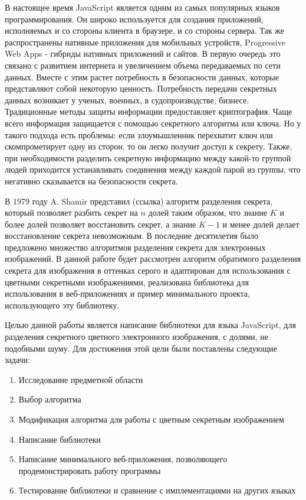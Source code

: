 \documentclass[a4paper,article,14pt]{extarticle}
\begin{document}


\tableofcontents
\pagebreak

В настоящее время JavaScript является одним из самых популярных языков программирования. Он широко используется для создания приложений,
исполняемых и со стороны клиента в браузере, и со стороны сервера. Так же распространены нативные приложения для мобильных устройств, 
Progressive Web Apps - гибриды нативных приложений и сайтов. В первую очередь это связано с развитием интернета и увеличением объема
передаваемых по сети данных. Вместе с этим растет потребность в безопасности данных, которые представляют собой некоторую ценность.
Потребность передачи секретных данных возникает у ученых, военных, в судопроизводстве, бизнесе. 
Традиционные методы защиты информации предоставляет криптография. Чаще всего информация защищается с помощью секретного алгоритма или ключа.
Но у такого подхода есть проблемы: если злоумышленник перехватит ключ или скомпрометирует одну из сторон, то он легко получит доступ к секрету.
Также, при необходимости разделить секретную информацию между какой-то группой людей приходится устанавливать соединения между каждой парой из группы,
что негативно сказывается на безопасности секрета.

В 1979 году A. Shamir представил (ссылка) алгоритм 
разделения секрета, который позволяет разбить секрет на $n$ долей таким образом, что знание $K$ и более долей позволяет восстановить 
секрет, а знание $K-1$ и менее долей делает восстановление секрета невозможным. В последние десятилетия было предложено множество 
алгоритмов разделения секрета для электронных изображений. В данной работе будет рассмотрен алгоритм обратимого 
разделения секрета для изображения в оттенках серого и адаптирован для использования с цветными секретными изображениями,
реализована библиотека для использования в веб-приложениях и пример минимального проекта, использующего эту 
библиотеку.

\newpage
{}

Целью данной работы является написание библиотеки для языка JavaScript, для разделения секретного цветного электронного изображения,
с долями, не подобными шуму. Для достижения этой цели были поставлены следующие задачи:
\begin{enumerate}
    \item Исследование предметной области
    \item Выбор алгоритма
    \item Модификация алгоритма для работы с цветным секретным изображением
    \item Написание библиотеки
    \item Написание минимального веб-приложения, позволяющего продемонстрировать работу программы
    \item Тестирование библиотеки и сравнение с имплементациями на других языках 
\end{enumerate}
\end{document}
